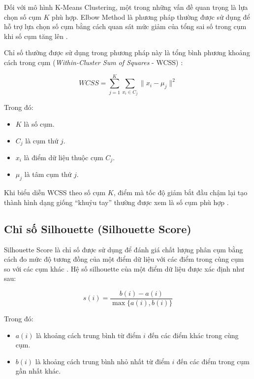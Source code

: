 Đối với mô hình K-Means Clustering, một trong những vấn đề quan trọng là lựa chọn số cụm \(K\) phù hợp. Elbow Method là phương pháp thường được sử dụng để hỗ trợ lựa chọn số cụm bằng cách quan sát mức giảm của tổng sai số trong cụm khi số cụm tăng lên \cite{sklearn_kmeans}.

Chỉ số thường được sử dụng trong phương pháp này là tổng bình phương khoảng cách trong cụm (\textit{Within-Cluster Sum of Squares} - WCSS) \cite{sklearn_kmeans}:

\begin{equation}
WCSS = \sum_{j=1}^{K} \sum_{x_i \in C_j} \|x_i - \mu_j\|^2
\label{eq:wcss}
\end{equation}

Trong đó:
\begin{itemize}
    \item \(K\) là số cụm.
    \item \(C_j\) là cụm thứ \(j\).
    \item \(x_i\) là điểm dữ liệu thuộc cụm \(C_j\).
    \item \(\mu_j\) là tâm cụm thứ \(j\).
\end{itemize}

Khi biểu diễn WCSS theo số cụm \(K\), điểm mà tốc độ giảm bắt đầu chậm lại tạo thành hình dạng giống ``khuỷu tay'' thường được xem là số cụm phù hợp \cite{sklearn_kmeans}.

\subsection*{\thesubsection\quad Chỉ số Silhouette (Silhouette Score)}

Silhouette Score là chỉ số được sử dụng để đánh giá chất lượng phân cụm bằng cách đo mức độ tương đồng của một điểm dữ liệu với các điểm trong cùng cụm so với các cụm khác \cite{sklearn_silhouette}. Hệ số silhouette của một điểm dữ liệu được xác định như sau:

\begin{equation}
s(i) = \frac{b(i) - a(i)}{\max \{a(i), b(i)\}}
\label{eq:silhouette}
\end{equation}

Trong đó:
\begin{itemize}
    \item \(a(i)\) là khoảng cách trung bình từ điểm \(i\) đến các điểm khác trong cùng cụm.
    \item \(b(i)\) là khoảng cách trung bình nhỏ nhất từ điểm \(i\) đến các điểm trong cụm gần nhất khác.
\end{itemize}

